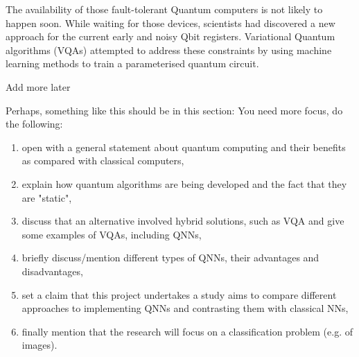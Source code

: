 The availability of those fault-tolerant Quantum computers is not likely to happen soon. 
While waiting for those devices, scientists had discovered a new approach for the current early and noisy Qbit registers.
Variational Quantum algorithms (VQAs) \cite{cerezo2021variational} attempted to address these constraints by using machine learning methods to train a parameterised quantum circuit.
\begin{center}
    \vspace{10pt}
    Add more later
    \vspace{10pt} 
\end{center}
Perhaps, something like this should be in this section: You need more focus, do the following:
\begin{enumerate}
    \item open with a general statement about quantum computing and their benefits as compared with classical computers, 
    \item explain how quantum algorithms are being developed and the fact that they are "static",
    \item discuss that an alternative involved hybrid solutions, such as VQA and give some examples of VQAs, including QNNs, 
    \item briefly discuss/mention different types of QNNs, their advantages and disadvantages, 
    \item set a claim that this project undertakes a study aims to compare different approaches to implementing QNNs and contrasting them with classical NNs, 
    \item finally mention that the research will focus on a classification problem (e.g. of images).
\end{enumerate}
